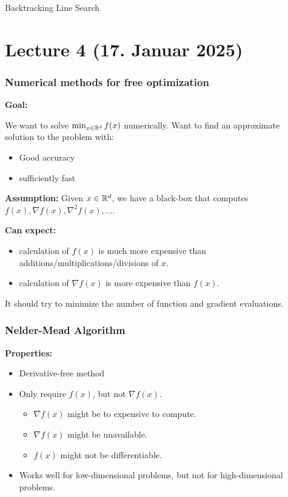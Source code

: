 \begin{algorithm}[H]
  \caption{Backtracking Line Search}
  \label{alg:backtracking}
  \;
  \KwRet{ \(\alpha\)}\;
\end{algorithm}
\newpage

\section{Lecture 4 (17. Januar 2025)}

\subsubsection*{Numerical methods for free optimization}

\textbf{Goal:}

We want to solve \( \min_{x \in \mathbb{R}^d} f(x) \) numerically. Want to find an approximate solution to the problem with:

\begin{itemize}
  \item Good accuracy
  \item sufficiently fast
\end{itemize}

\textbf{Assumption:} Given  \( x \in \mathbb{R}^d \), we have a black-box that computes  \(f(x), \nabla f(x), \nabla^2 f(x) , \ldots \).

\textbf{Can expect:}
\begin{itemize}
  \item calculation of \(f(x)\) is much more expensive than additions/multiplications/divisions of \(x\).
  \item calculation of \(\nabla f(x)\) is more expensive than \(f(x)\).
\end{itemize}

It should try to minimize the number of function and gradient evaluations.

\subsubsection*{Nelder-Mead Algorithm}
\textbf{Properties:}
\begin{itemize}
  \item Derivative-free method
  \item Only require  \(f(x)\), but not  \(\nabla f(x)\).
        \begin{itemize}
          \item  \(\nabla f(x)\) might be to expensive to compute.
          \item  \(\nabla f(x)\) might be unavailable.
          \item  \(f(x)\) might not be differentiable.
        \end{itemize}
  \item Works well for low-dimensional problems, but not for high-dimensional problems.
\end{itemize}

